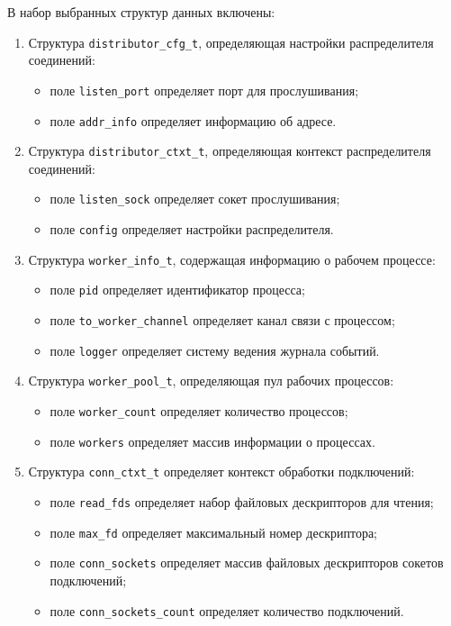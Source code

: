 В набор выбранных структур данных включены:
\begin{enumerate}
	
	\item Структура \texttt{distributor\_cfg\_t}, определяющая настройки распределителя соединений:
	\begin{itemize}
		\item поле \texttt{listen\_port} определяет порт для прослушивания;
		\item поле \texttt{addr\_info} определяет информацию об адресе.
	\end{itemize}
	
	\item Структура \texttt{distributor\_ctxt\_t}, определяющая контекст распределителя соединений:
	\begin{itemize}
		\item поле \texttt{listen\_sock} определяет сокет прослушивания;
		\item поле \texttt{config} определяет настройки распределителя.
	\end{itemize}
	
	\item Структура \texttt{worker\_info\_t}, содержащая информацию о рабочем процессе:
	\begin{itemize}
		\item поле \texttt{pid} определяет идентификатор процесса;
		\item поле \texttt{to\_worker\_channel} определяет канал связи с процессом;
		\item поле \texttt{logger} определяет систему ведения журнала событий.
	\end{itemize}
	
	\item Структура \texttt{worker\_pool\_t}, определяющая пул рабочих процессов:
	\begin{itemize}
		\item поле \texttt{worker\_count} определяет количество процессов;
		\item поле \texttt{workers} определяет массив информации о процессах.
	\end{itemize}
	
	\item Структура \texttt{conn\_ctxt\_t} определяет контекст обработки подключений:
	\begin{itemize}
		\item поле \texttt{read\_fds} определяет набор файловых дескрипторов для чтения;
		\item поле \texttt{max\_fd} определяет максимальный номер дескриптора;
		\item поле \texttt{conn\_sockets} определяет массив файловых дескрипторов сокетов подключений;
		\item поле \texttt{conn\_sockets\_count} определяет количество подключений.
	\end{itemize}
	

\end{enumerate}
